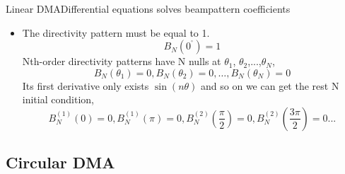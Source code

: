 \documentclass{beamer}
\begin{document}
\begin{frame}{Linear DMA}{Differential equations solves beampattern coefficients}
\begin{itemize}
\item{
The directivity pattern must be equal to 1.
\begin{equation}
 {{B}_{N}}({{0}^{{}^\circ }})=1
\end{equation}
Nth-order directivity patterns have N nulls at $ {\theta _1} $, $ {\theta _2} $,...,$ {\theta _N} $,
\begin{equation}
{{B}_{N}}({{\theta }_{1}})=0,{{B}_{N}}({{\theta }_{2}})=0,\ldots ,{{B}_{N}}({{\theta }_{N}})=0
\end{equation}
Its first derivative only exists $ \sin (n\theta ) $ and so on we can get the rest N initial condition,
\begin{equation}
B_{N}^{(1)}(0)=0,B_{N}^{(1)}(\pi )=0,B_{N}^{(2)}(\frac{\pi }{2})=0,B_{N}^{(2)}(\frac{3\pi }{2})=0...
\end{equation}
}
\end{itemize}
	
\end{frame}


\subsection{Circular DMA}
\end{document}
